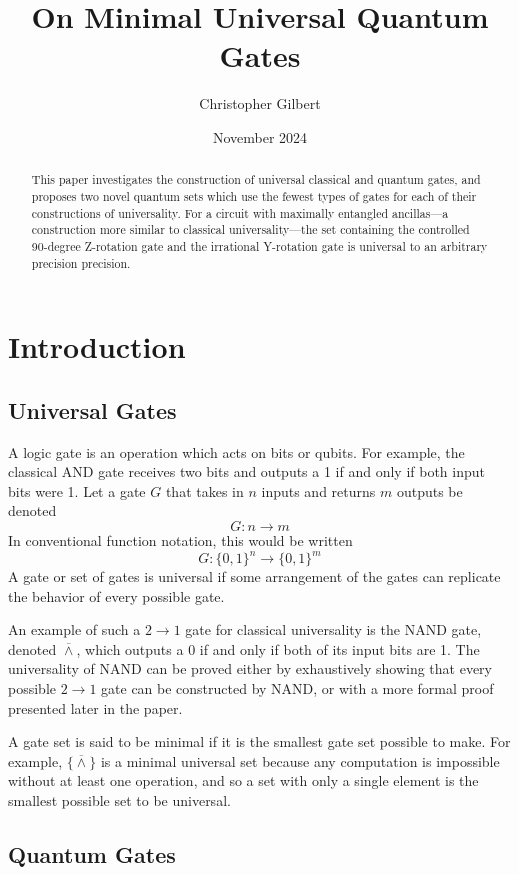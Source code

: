 \documentclass[12pt]{article}
\title{On Minimal Universal Quantum Gates}
\author{Christopher Gilbert}
\date{November 2024}
\newcommand{\nand}{\overline{\land}}
\begin{document}
\maketitle
\newpage

\begin{abstract}
This paper investigates the construction of universal classical and quantum gates, and proposes two novel quantum sets which use the fewest types of gates for each of their constructions of universality. For a circuit with  maximally entangled ancillas—a construction more similar to classical universality—the set containing the controlled 90-degree Z-rotation gate and the irrational Y-rotation gate is universal to an arbitrary precision precision.
\end{abstract}
\newpage

\section{Introduction}

\subsection{Universal Gates}
A logic gate is an operation which acts on bits or qubits. For example, the classical AND gate receives two bits and outputs a 1 if and only if both input bits were 1. Let a gate $G$ that takes in $n$ inputs and returns $m$ outputs be denoted
$$G : n \to m$$
In conventional function notation, this would be written
$$G : \{0, 1\}^n \to \{0, 1\}^m$$
A gate or set of gates is universal if some arrangement of the gates can replicate the behavior of every possible gate.

An example of such a $2 \to 1$ gate for classical universality is the NAND gate, denoted $\nand$, which outputs a 0 if and only if both of its input bits are 1. The universality of NAND can be proved either by exhaustively showing that every possible $2 \to 1$ gate can be constructed by NAND, or with a more formal proof presented later in the paper.

A gate set is said to be minimal if it is the smallest gate set possible to make. For example, $\{ \nand \}$ is a minimal universal set because any computation is impossible without at least one operation, and so a set with only a single element is the smallest possible set to be universal.

\subsection{Quantum Gates}
\end{document}
